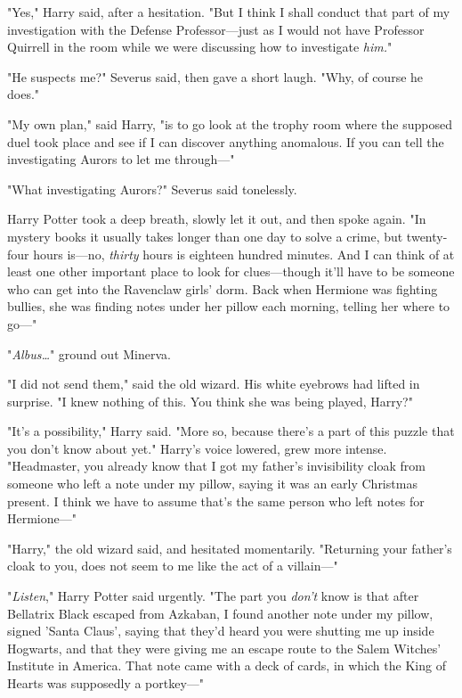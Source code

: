"Yes," Harry said, after a hesitation. "But I think I shall conduct that part 
of my investigation with the Defense Professor---just as I would not have 
Professor Quirrell in the room while we were discussing how to investigate 
\emph{him.}"

"He suspects me?" Severus said, then gave a short laugh. "Why, of course he 
does."

"My own plan," said Harry, "is to go look at the trophy room where the supposed 
duel took place and see if I can discover anything anomalous. If you can tell 
the investigating Aurors to let me through---"

"What investigating Aurors?" Severus said tonelessly.

Harry Potter took a deep breath, slowly let it out, and then spoke again. "In 
mystery books it usually takes longer than one day to solve a crime, but 
twenty-four hours is---no, \emph{thirty} hours is eighteen hundred minutes. And 
I can think of at least one other important place to look for clues---though 
it'll have to be someone who can get into the Ravenclaw girls' dorm. Back when 
Hermione was fighting bullies, she was finding notes under her pillow each 
morning, telling her where to go---"

"\emph{Albus{\ldots}}" ground out Minerva.

"I did not send them," said the old wizard. His white eyebrows had lifted in 
surprise. "I knew nothing of this. You think she was being played, Harry?"

"It's a possibility," Harry said. "More so, because there's a part of this 
puzzle that you don't know about yet." Harry's voice lowered, grew more 
intense. "Headmaster, you already know that I got my father's invisibility 
cloak from someone who left a note under my pillow, saying it was an early 
Christmas present. I think we have to assume that's the same person who left 
notes for Hermione---"

"Harry," the old wizard said, and hesitated momentarily. "Returning your 
father's cloak to you, does not seem to me like the act of a villain---"

"\emph{Listen}," Harry Potter said urgently. "The part you \emph{don't} know is 
that after Bellatrix Black escaped from Azkaban, I found another note under my 
pillow, signed 'Santa Claus', saying that they'd heard you were shutting me up 
inside Hogwarts, and that they were giving me an escape route to the Salem 
Witches' Institute in America. That note came with a deck of cards, in which 
the King of Hearts was supposedly a portkey---"


